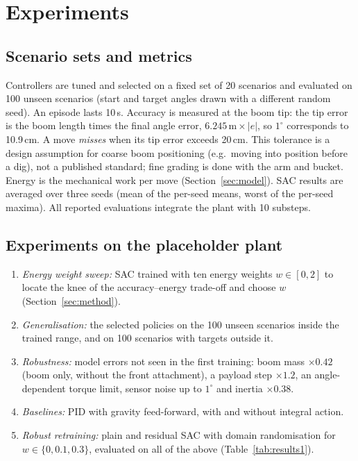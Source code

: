 \section{Experiments}
\label{sec:exp}

\subsection{Scenario sets and metrics}
Controllers are tuned and selected on a fixed set of 20 scenarios and evaluated on 100 unseen
scenarios (start and target angles drawn with a different random seed). An episode lasts 10\,s.
Accuracy is measured at the boom tip: the tip error is the boom length times the final angle
error, $6.245\,\mathrm{m}\times|e|$, so $1^\circ$ corresponds to 10.9\,cm.
A move \emph{misses} when its tip error exceeds 20\,cm. This tolerance is a design assumption
for coarse boom positioning (e.g.\ moving into position before a dig), not a published
standard; fine grading is done with the arm and bucket.
Energy is the mechanical work per move (Section~\ref{sec:model}).
SAC results are averaged over three seeds (mean of the per-seed means, worst of the per-seed
maxima). All reported evaluations integrate the plant with 10 substeps.

\subsection{Experiments on the placeholder plant}
\begin{enumerate}
\item \emph{Energy weight sweep:} SAC trained with ten energy weights $w\in[0,2]$ to locate the
knee of the accuracy--energy trade-off and choose $w$ (Section~\ref{sec:method}).
\item \emph{Generalisation:} the selected policies on the 100 unseen scenarios inside the
trained range, and on 100 scenarios with targets outside it.
\item \emph{Robustness:} model errors not seen in the first training: boom mass $\times0.42$
(boom only, without the front attachment), a payload step $\times1.2$, an angle-dependent torque
limit, sensor noise up to $1^\circ$ and inertia $\times0.38$.
\item \emph{Baselines:} PID with gravity feed-forward, with and without integral action.
\item \emph{Robust retraining:} plain and residual SAC with domain randomisation for
$w\in\{0, 0.1, 0.3\}$, evaluated on all of the above (Table~\ref{tab:results1}).
\end{enumerate}

